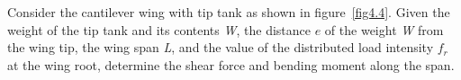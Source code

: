 \documentclass{AeroStructure-ERJohnson}
\begin{document}
\begin{example}\label{ex4.1}\setcounter{equation}{0}\def\theequation{\alph{equation}}%
Consider the cantilever wing with tip tank as shown in figure~\ref{fig4.4}. Given the weight of the tip tank and its contents \textit{W}, the distance $e$ of the weight \textit{W} from the wing tip, the wing span \textit{L}, and the value of the distributed load intensity $f_{r}$ at the wing root, determine the shear force and bending moment along the span.

{\def\thefigure{4.4}
}


\end{example}
\end{document}
